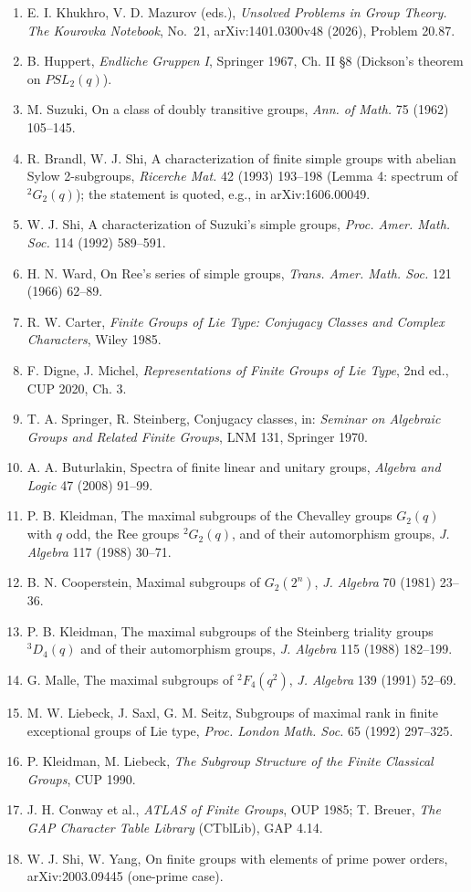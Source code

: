 \documentclass[11pt,a4paper]{article}
\providecommand{\tightlist}{\setlength{\itemsep}{1pt}\setlength{\parskip}{0pt}}
\begin{document}
\begin{enumerate}
\def\labelenumi{\arabic{enumi}.}
\tightlist
\item
  E. I. Khukhro, V. D. Mazurov (eds.), \emph{Unsolved Problems in Group
  Theory. The Kourovka Notebook}, No.~21, arXiv:1401.0300v48 (2026),
  Problem 20.87.
\item
  B. Huppert, \emph{Endliche Gruppen I}, Springer 1967, Ch. II §8
  (Dickson's theorem on \(PSL_2(q)\)).
\item
  M. Suzuki, On a class of doubly transitive groups, \emph{Ann. of
  Math.} 75 (1962) 105--145.
\item
  R. Brandl, W. J. Shi, A characterization of finite simple groups with
  abelian Sylow 2-subgroups, \emph{Ricerche Mat.} 42 (1993) 193--198
  (Lemma 4: spectrum of \({}^2G_2(q)\)); the statement is quoted, e.g.,
  in arXiv:1606.00049.
\item
  W. J. Shi, A characterization of Suzuki's simple groups, \emph{Proc.
  Amer. Math. Soc.} 114 (1992) 589--591.
\item
  H. N. Ward, On Ree's series of simple groups, \emph{Trans. Amer. Math.
  Soc.} 121 (1966) 62--89.
\item
  R. W. Carter, \emph{Finite Groups of Lie Type: Conjugacy Classes and
  Complex Characters}, Wiley 1985.
\item
  F. Digne, J. Michel, \emph{Representations of Finite Groups of Lie
  Type}, 2nd ed., CUP 2020, Ch. 3.
\item
  T. A. Springer, R. Steinberg, Conjugacy classes, in: \emph{Seminar on
  Algebraic Groups and Related Finite Groups}, LNM 131, Springer 1970.
\item
  A. A. Buturlakin, Spectra of finite linear and unitary groups,
  \emph{Algebra and Logic} 47 (2008) 91--99.
\item
  P. B. Kleidman, The maximal subgroups of the Chevalley groups
  \(G_2(q)\) with \(q\) odd, the Ree groups \({}^2G_2(q)\), and of their
  automorphism groups, \emph{J. Algebra} 117 (1988) 30--71.
\item
  B. N. Cooperstein, Maximal subgroups of \(G_2(2^n)\), \emph{J.
  Algebra} 70 (1981) 23--36.
\item
  P. B. Kleidman, The maximal subgroups of the Steinberg triality groups
  \({}^3D_4(q)\) and of their automorphism groups, \emph{J. Algebra} 115
  (1988) 182--199.
\item
  G. Malle, The maximal subgroups of \({}^2F_4(q^2)\), \emph{J. Algebra}
  139 (1991) 52--69.
\item
  M. W. Liebeck, J. Saxl, G. M. Seitz, Subgroups of maximal rank in
  finite exceptional groups of Lie type, \emph{Proc. London Math. Soc.}
  65 (1992) 297--325.
\item
  P. Kleidman, M. Liebeck, \emph{The Subgroup Structure of the Finite
  Classical Groups}, CUP 1990.
\item
  J. H. Conway et al., \emph{ATLAS of Finite Groups}, OUP 1985; T.
  Breuer, \emph{The GAP Character Table Library} (CTblLib), GAP 4.14.
\item
  W. J. Shi, W. Yang, On finite groups with elements of prime power
  orders, arXiv:2003.09445 (one-prime case).
\end{enumerate}
\end{document}
